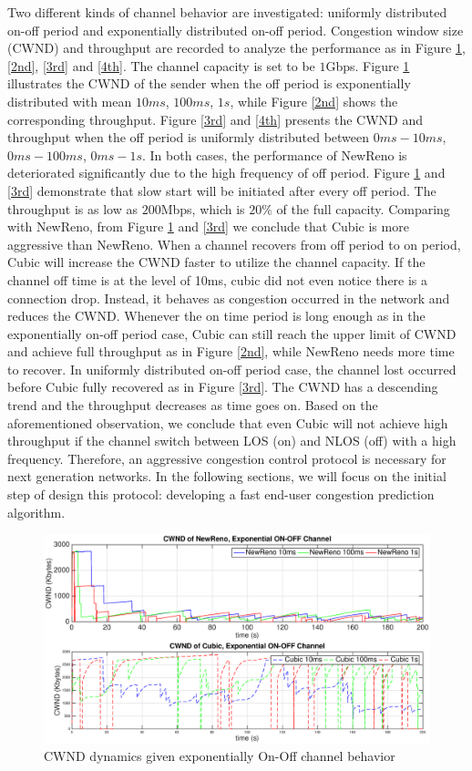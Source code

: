 Two different kinds of channel behavior are investigated: uniformly distributed on-off period and exponentially distributed on-off period. Congestion window size (CWND) and throughput are recorded to analyze the performance as in Figure \ref{1st}, \ref{2nd}, \ref{3rd} and \ref{4th}.  The channel capacity is set to be $1$Gbps. Figure \ref{1st} illustrates the CWND of the sender when the off period is exponentially distributed with mean $10ms$, $100ms$, $1s$, while Figure \ref{2nd} shows the corresponding throughput. Figure \ref{3rd} and \ref{4th} presents the CWND and throughput when the off period is uniformly distributed between $0ms - 10ms$, $0ms - 100ms$, $0ms - 1s$. In both cases, the performance of NewReno is deteriorated significantly due to the high frequency of off period. Figure \ref{1st} and \ref{3rd} demonstrate that slow start will be initiated after every off period. The throughput is as low as $200$Mbps, which is $20\%$ of the full capacity. Comparing with NewReno, from Figure \ref{1st} and \ref{3rd} we conclude that Cubic is more aggressive than NewReno. When a channel recovers from off period to on period, Cubic will increase the CWND faster to utilize the channel capacity.  If the channel off time is at the level of 10ms, cubic did not even notice there is a connection drop. Instead, it behaves as congestion occurred in the network and reduces the CWND. Whenever the on time period is long enough as in the exponentially on-off period case, Cubic can still reach the upper limit of CWND and achieve full throughput as in Figure \ref{2nd}, while NewReno needs more time to recover. In uniformly distributed on-off period case, the channel lost occurred before Cubic fully recovered as in Figure \ref{3rd}. The CWND has a descending trend and the throughput decreases as time goes on. Based on the aforementioned observation, we conclude that even Cubic will not achieve high throughput if the channel switch between LOS (on) and NLOS (off) with a high frequency. Therefore, an aggressive congestion control protocol is necessary for next generation networks. In the following sections, we will focus on the initial step of design this protocol: developing a fast end-user congestion prediction algorithm.
\begin{figure}
\centering
\includegraphics[width=14cm]{1.eps}
\caption{CWND dynamics given exponentially On-Off channel behavior}
\label{1st}
\end{figure}
